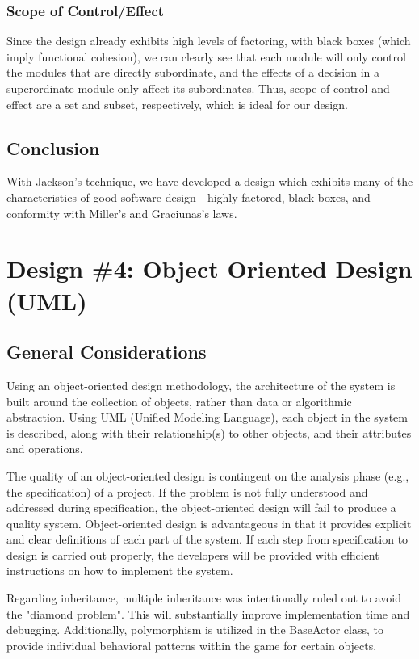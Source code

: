 \documentclass{article}
\begin{document}
		\subsubsection{Scope of Control/Effect}
			Since the design already exhibits high levels of factoring, with black boxes (which imply functional cohesion), we can clearly see that each module will only control the modules that are directly subordinate, and the effects of a decision in a superordinate module only affect its subordinates. Thus, scope of control and effect are a set and subset, respectively, which is ideal for our design. 
	\subsection{Conclusion}
		With Jackson's technique, we have developed a design which exhibits many of the characteristics of good software design - highly factored, black boxes, and conformity with Miller's and Graciunas's laws.  
%
%
\section{Design \#4: Object Oriented Design (UML)}
	\subsection{General Considerations}
		Using an object-oriented design methodology, the architecture of the system is built around the collection of objects, rather than data or algorithmic abstraction. Using UML (Unified Modeling Language), each object in the system is described, along with their relationship(s) to other objects, and their attributes and operations. 
		
		The quality of an object-oriented design is contingent on the analysis phase (e.g., the specification) of a project. If the problem is not fully understood and addressed during specification, the object-oriented design will fail to produce a quality system. Object-oriented design is advantageous in that it provides explicit and clear definitions of each part of the system. If each step from specification to design is carried out properly, the developers will be provided with efficient instructions on how to implement the system.
		
		Regarding inheritance, multiple inheritance was intentionally ruled out to avoid the "diamond problem". This will substantially improve implementation time and debugging. Additionally, polymorphism is utilized in the BaseActor class, to provide individual behavioral patterns within the game for certain objects.
		
\end{document}
